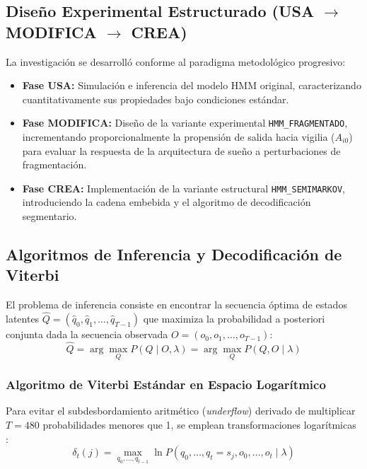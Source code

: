 \documentclass[11pt,a4paper]{article}
\begin{document}
\subsection{Diseño Experimental Estructurado (USA \texorpdfstring{$\to$}{->} MODIFICA \texorpdfstring{$\to$}{->} CREA)}
La investigación se desarrolló conforme al paradigma metodológico progresivo:
\begin{itemize}[leftmargin=*,itemsep=1pt]
    \item \textbf{Fase USA:} Simulación e inferencia del modelo HMM original, caracterizando cuantitativamente sus propiedades bajo condiciones estándar.
    \item \textbf{Fase MODIFICA:} Diseño de la variante experimental \texttt{HMM\_FRAGMENTADO}, incrementando proporcionalmente la propensión de salida hacia vigilia ($A_{i0}$) para evaluar la respuesta de la arquitectura de sueño a perturbaciones de fragmentación.
    \item \textbf{Fase CREA:} Implementación de la variante estructural \texttt{HMM\_SEMIMARKOV}, introduciendo la cadena embebida y el algoritmo de decodificación segmentario.
\end{itemize}

\subsection{Algoritmos de Inferencia y Decodificación de Viterbi}
El problema de inferencia consiste en encontrar la secuencia óptima de estados latentes $\hat{Q} = (\hat{q}_0, \hat{q}_1, \dots, \hat{q}_{T-1})$ que maximiza la probabilidad a posteriori conjunta dada la secuencia observada $O = (o_0, o_1, \dots, o_{T-1})$:
\begin{equation}
    \hat{Q} = \arg\max_Q P(Q \mid O, \lambda) = \arg\max_Q P(Q, O \mid \lambda)
\end{equation}

\subsubsection{Algoritmo de Viterbi Estándar en Espacio Logarítmico}
Para evitar el subdesbordamiento aritmético (\textit{underflow}) derivado de multiplicar $T=480$ probabilidades menores que 1, se emplean transformaciones logarítmicas \cite{rabiner1989}:
\begin{equation}
    \delta_t(j) = \max_{q_0, \dots, q_{t-1}} \ln P(q_0, \dots, q_t = s_j, o_0, \dots, o_t \mid \lambda)
\end{equation}
\end{document}
